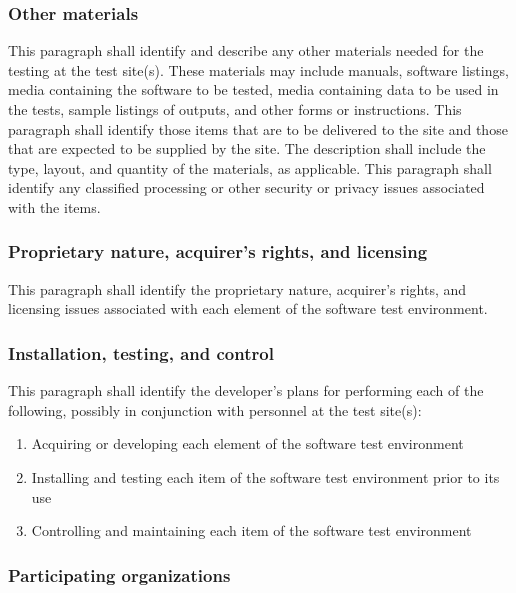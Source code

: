 \subsubsection{Other materials}

This paragraph shall identify and describe any other materials needed
for the testing at the test site(s). These materials may include
manuals, software listings, media containing the software to be tested,
media containing data to be used in the tests, sample listings of
outputs, and other forms or instructions. This paragraph shall identify
those items that are to be delivered to the site and those that are
expected to be supplied by the site. The description shall include the
type, layout, and quantity of the materials, as applicable. This
paragraph shall identify any classified processing or other security or
privacy issues associated with the items.

\subsubsection{Proprietary nature, acquirer's rights, and
licensing}

This paragraph shall identify the proprietary nature, acquirer's rights,
and licensing issues associated with each element of the software test
environment.

\subsubsection{Installation, testing, and control}

This paragraph shall identify the developer's plans for performing each
of the following, possibly in conjunction with personnel at the test
site(s):

\begin{enumerate}
\itemsep1pt\parskip0pt
\item
  Acquiring or developing each element of the software test environment
\item
  Installing and testing each item of the software test environment
  prior to its use
\item
  Controlling and maintaining each item of the software test environment
\end{enumerate}

\subsubsection{Participating organizations}

